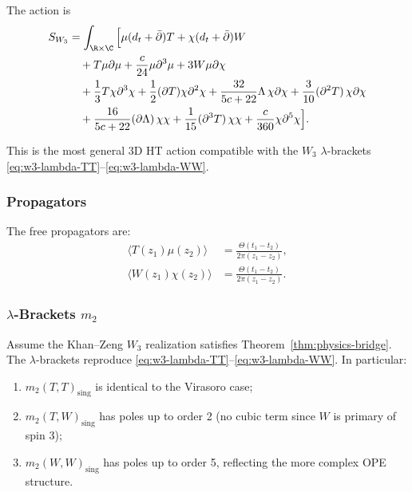 The action is
\begin{align}
S_{W_3} &= \int_{\R \times \C} \Big[ \mu (d_t + \bar{\partial})T + \chi (d_t + \bar{\partial})W \notag\\
&\quad + T \mu \partial \mu + \frac{c}{24} \mu \partial^3 \mu + 3W \mu \partial \chi \notag\\
&\quad + \frac{1}{3}T \chi \partial^3 \chi + \frac{1}{2}(\partial T) \chi \partial^2 \chi + \frac{32}{5c+22}\Lambda\, \chi \partial \chi + \frac{3}{10}(\partial^2 T)\,\chi \partial \chi \notag\\
&\quad + \frac{16}{5c+22}(\partial\Lambda)\, \chi \chi + \frac{1}{15}(\partial^3 T)\,\chi \chi + \frac{c}{360} \chi \partial^5 \chi \Big].
\end{align}

This is the most general 3D HT action compatible with the $W_3$ $\lambda$-brackets \eqref{eq:w3-lambda-TT}--\eqref{eq:w3-lambda-WW}.

\subsubsection{Propagators}

The free propagators are:
\begin{align}
\langle T(z_1) \mu(z_2) \rangle &= \frac{\Theta(t_1-t_2)}{2\pi(z_1-z_2)},\\
\langle W(z_1) \chi(z_2) \rangle &= \frac{\Theta(t_1-t_2)}{2\pi(z_1-z_2)}.
\end{align}

\subsubsection{$\lambda$-Brackets $m_2$}

\begin{proposition}
Assume the Khan--Zeng $W_3$ realization satisfies
Theorem~\ref{thm:physics-bridge}.
The $\lambda$-brackets reproduce \eqref{eq:w3-lambda-TT}--\eqref{eq:w3-lambda-WW}. In particular:
\begin{enumerate}
\item $m_2(T,T)_{\text{sing}}$ is identical to the Virasoro case;
\item $m_2(T,W)_{\text{sing}}$ has poles up to order 2 (no cubic term since $W$ is primary of spin 3);
\item $m_2(W,W)_{\text{sing}}$ has poles up to order 5, reflecting the more complex OPE structure.
\end{enumerate}
\end{proposition}

